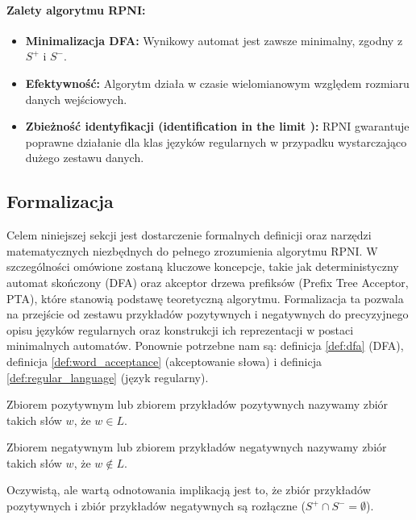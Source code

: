\paragraph*{Zalety algorytmu RPNI:}
\begin{itemize}
    \item \textbf{Minimalizacja DFA:} Wynikowy automat jest zawsze minimalny, zgodny z \( S^+ \) i \( S^- \).
    \item \textbf{Efektywność:} Algorytm działa w czasie wielomianowym względem rozmiaru danych wejściowych.
    \item \textbf{Zbieżność identyfikacji (identification in the limit \cite{GOLD1967447}):} RPNI gwarantuje poprawne działanie dla klas języków regularnych w przypadku wystarczająco dużego zestawu danych.
\end{itemize}

\subsection{Formalizacja}

Celem niniejszej sekcji jest dostarczenie formalnych definicji oraz narzędzi matematycznych niezbędnych do pełnego zrozumienia algorytmu RPNI. W szczególności omówione zostaną kluczowe koncepcje, takie jak deterministyczny automat skończony (DFA) oraz akceptor drzewa prefiksów (Prefix Tree Acceptor, PTA), które stanowią podstawę teoretyczną algorytmu. Formalizacja ta pozwala na przejście od zestawu przykładów pozytywnych i negatywnych do precyzyjnego opisu języków regularnych oraz konstrukcji ich reprezentacji w postaci minimalnych automatów. Ponownie potrzebne nam są: definicja \ref{def:dfa} (DFA), definicja \ref{def:word_acceptance} (akceptowanie słowa) i definicja \ref{def:regular_language} (język regularny).

\begin{definition}
    Zbiorem pozytywnym lub zbiorem przykładów pozytywnych nazywamy zbiór takich słów $w$, że \( w \in L \).
\end{definition}

\begin{definition}
    Zbiorem negatywnym lub zbiorem przykładów negatywnych nazywamy zbiór takich słów $w$, że \( w \notin L \).
\end{definition}

Oczywistą, ale wartą odnotowania implikacją jest to, że zbiór przykładów pozytywnych i zbiór przykładów negatywnych są rozłączne (\( S^+ \cap S^- = \emptyset \)).

